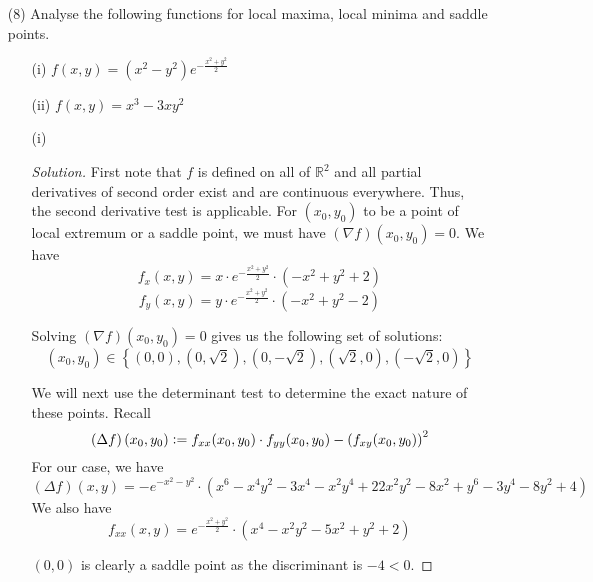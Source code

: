 \documentclass[12pt]{article}
\theoremstyle{definition}
\newenvironment{soln}{\begin{proof}[Solution]}{\end{proof}}
\begin{document}
\begin{enumerate}[leftmargin=*]
    \newpage
    
    \item[(8)] Analyse the following functions for local maxima, local minima and saddle points. 
    
    \begin{multicols}{2}
        \begin{enumerate}
            \item[(i)] $f(x,y) = \left( x^2 - y^2 \right) e^{-\frac{x^2+y^2}{2}}$
            \item[(ii)] $f(x,y) = x^3 - 3xy^2$
        \end{enumerate}
    \end{multicols}
    
    \begin{enumerate}[leftmargin=*]
        \itemsep0.5em
        \item[(i)] \begin{soln}
            First note that $f$ is defined on all of $\mathbb{R}^2$ and all partial derivatives of second order exist and are continuous everywhere. Thus, the second derivative test is applicable. For $(x_0, y_0)$ to be a point of local extremum or a saddle point, we must have $(\nabla f)(x_0, y_0) = 0$. We have
            \[
                f_x(x,y) = x \cdot e^{-\frac{x^2+y^2}{2}} \cdot \left( -x^2 + y^2 + 2\right)
            \]
            \[
                f_y(x,y) = y \cdot e^{-\frac{x^2+y^2}{2}} \cdot \left( -x^2 + y^2 - 2\right)
            \]
            
            Solving $(\nabla f)(x_0, y_0) = 0$ gives us the following set of solutions:
            \[
                (x_0, y_0) \in \left\{ (0,0), (0,\sqrt{2}), (0,-\sqrt{2}), (\sqrt{2}, 0), (-\sqrt{2}, 0) \right\}
            \]
            
            We will next use the determinant test to determine the exact nature of these points. Recall 
            \[
                \left( \Delta f \right)(x_0, y_0) \vcentcolon= f_{xx}(x_0, y_0) \cdot f_{yy}(x_0, y_0) - \left( f_{xy}(x_0, y_0) \right)^2
            \]
            For our case, we have
            \[
                \left( \Delta f \right)(x,y) = -e^{-x^2-y^2} \cdot \left( x^6 - x^4 y^2 - 3x^4 -x^2 y^4 + 22x^2y^2 -8x^2 + y^6 - 3y^4 -8y^2 +4  \right)
            \]
            We also have
            \[
                f_{xx}(x,y) = e^{-\frac{x^2+y^2}{2}} \cdot \left( x^4 - x^2y^2 -5x^2 +y^2 + 2 \right)
            \]
            
            $(0,0)$ is clearly a saddle point as the discriminant is $-4 < 0$.
            

\end{soln}
\end{enumerate}
\end{enumerate}
\end{document}

